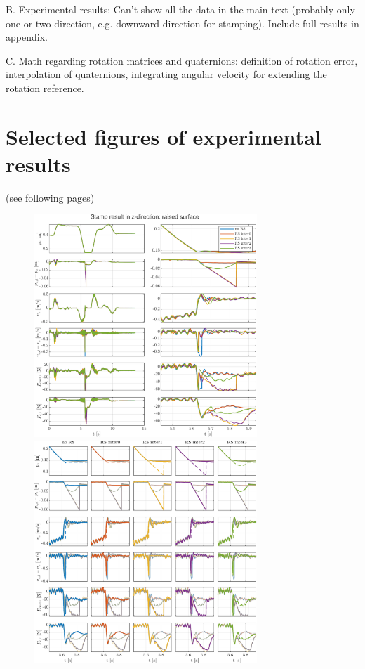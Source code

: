 \documentclass[11pt]{report}
\numberwithin{equation}{section}        %
\numberwithin{figure}{section}          %
\numberwithin{table}{section}           %
\begin{document}
B.  Experimental results: Can’t show all the data in the main text (probably only one or two direction, e.g. downward direction for stamping). Include full results in appendix.

C.  Math regarding rotation matrices and quaternions: definition of rotation error, interpolation of quaternions, integrating angular velocity for extending the rotation reference.

  \newpage

  \section{Selected figures of experimental results}\label{sec:2}
  (see following pages)
\begin{figure}[]
  \centering
  \begin{adjustwidth}{0pt}{5pt}
  \centering
  \includegraphics[width=0.75\textwidth]{Graphics/Stamp result in z-direction raised surface.pdf}\\
    \includegraphics[width=0.75\textwidth]{Graphics/Stamp result in z-direction raised surface_.pdf}

\end{adjustwidth}
\end{figure}
\end{document}
